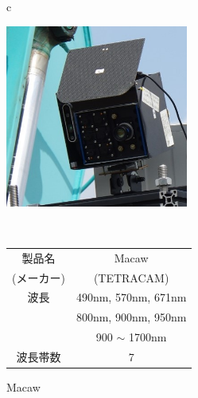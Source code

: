 \begin{figure}[p]
	\begin{center}
		\begin{tabular}{c}

			\begin{minipage}[t]{\linewidth}
			\hspace{4cm}\includegraphics[width=6cm]{./Ch4_WaterContentEstimation/Fig/multispectral_camera.jpg}
			\caption{Macaw}\label{fig:multispectral_camera}
			\vspace{2cm}
			\end{minipage}

			\\

			\begin{minipage}[b]{\linewidth}

			\label{tbl:multispectral_camera}

				\hspace{4cm} \begin{tabular}{|c|c|} \hline %
				製品名 & Macaw \\
				(メーカー) & (TETRACAM) \\ \hline
				波長 & 490nm, 570nm, 671nm \\ 
				     & 800nm, 900nm, 950nm \\
				     & 900 $\sim$ 1700nm \\ \hline
				波長帯数 & 7 \\ \hline
				\end{tabular}
			\end{minipage}


		\end{tabular}
	\end{center}
\end{figure}
 
\clearpage


